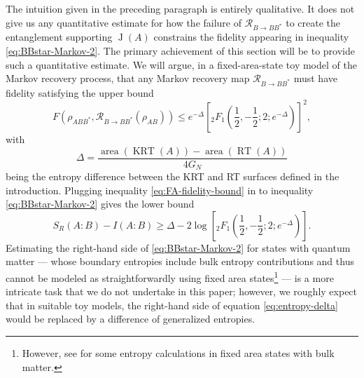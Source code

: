 \documentclass[a4paper,11pt]{article}
\newcommand{\area}{\operatorname{area}}
\newcommand{\RT}{\operatorname{RT}}
\newcommand{\KRT}{\operatorname{KRT}}
\newcommand{\J}{\operatorname{J}}
\begin{document}
The intuition given in the preceding paragraph is entirely qualitative. It does not give us any quantitative estimate for how the failure of $\mathcal{R}_{B \rightarrow B B^*}$ to create the entanglement supporting $\J(A)$ constrains the fidelity appearing in inequality \eqref{eq:BBstar-Markov-2}. The primary achievement of this section will be to provide such a quantitative estimate. We will argue, in a fixed-area-state toy model of the Markov recovery process, that any Markov recovery map $\mathcal{R}_{B \rightarrow B B^*}$ must have fidelity satisfying the upper bound
\begin{equation} \label{eq:FA-fidelity-bound}
    F(\rho_{ABB^*}, \mathcal{R}_{B \rightarrow B B^*}(\rho_{AB}))
        \leq e^{- \Delta}
                \left[{}_{2} F_1\left(\frac{1}{2}, - \frac{1}{2}; 2; e^{- \Delta} \right) \right]^2,
\end{equation}
with
\begin{equation} \label{eq:entropy-delta}
    \Delta = \frac{\area(\KRT(A)) - \area(\RT(A))}{4 G_N}
\end{equation}
being the entropy difference between the KRT and RT surfaces defined in the introduction. Plugging inequality \eqref{eq:FA-fidelity-bound} in to inequality \eqref{eq:BBstar-Markov-2} gives the lower bound
\begin{equation} \label{eq:final-fidelity-inequality}
    S_R(A:B) - I(A:B)
        \geq \Delta - 2 \log\left[ {}_{2} F_1\left(\frac{1}{2}, - \frac{1}{2}; 2; e^{- \Delta} \right) \right].
\end{equation}
Estimating the right-hand side of \eqref{eq:BBstar-Markov-2} for states with quantum matter --- whose boundary entropies include bulk entropy contributions and thus cannot be modeled as straightforwardly using fixed area states\footnote{However, see \cite{akers-penington} for some entropy calculations in fixed area states with bulk matter.} --- is a more intricate task that we do not undertake in this paper; however, we roughly expect that in suitable toy models, the right-hand side of equation \eqref{eq:entropy-delta} would be replaced by a difference of generalized entropies.
\end{document}
